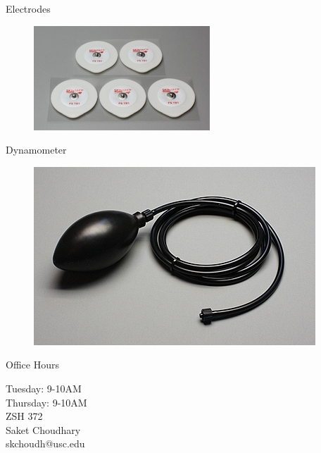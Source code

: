 \documentclass[10pt]{beamer}
\begin{document}
\begin{frame}[fragile]{Electrodes}
\begin{figure}
\includegraphics[width=\linewidth]{electrodes}
\end{figure}
\end{frame}

\begin{frame}[fragile]{Dynamometer}
\begin{figure}
\includegraphics[width=\linewidth]{FT-220}
\end{figure}
\end{frame}



\begin{frame}[fragile]{Office Hours}
\Large \begin{center}Tuesday: 9-10AM\\
Thursday: 9-10AM\\
ZSH 372\\
\vspace*{2cm}
Saket Choudhary\\ 
skchoudh@usc.edu\\
\end{center}


\end{frame}
\end{document}
